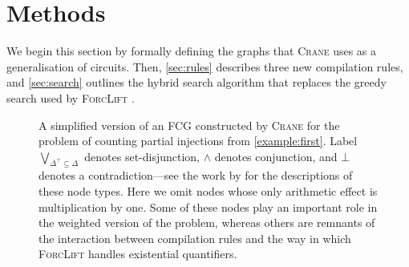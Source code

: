 \section{Methods}\label{sec:methods}

We begin this section by formally defining the graphs that \textsc{Crane} uses
as a generalisation of circuits. Then, \cref{sec:rules} describes three new
compilation rules, and \cref{sec:search} outlines the hybrid search algorithm
that replaces the greedy search used by \textsc{ForcLift}
\citep{DBLP:conf/ijcai/BroeckTMDR11}.

\begin{figure}[t]
  \centering
  \caption{A simplified version of an FCG constructed by \textsc{Crane} for the
    problem of counting partial injections from \cref{example:first}. Label
    $\bigvee_{\Delta^\top \subseteq \Delta}$ denotes set-disjunction, $\land$
    denotes conjunction, and $\bot$ denotes a contradiction---see the work by
    \citet{DBLP:conf/ijcai/BroeckTMDR11} for the descriptions of these node
    types. Here we omit nodes whose only arithmetic effect is multiplication by
    one. Some of these nodes play an important role in the weighted version of
    the problem, whereas others are remnants of the interaction between
    compilation rules and the way in which \textsc{ForcLift} handles existential
    quantifiers.}\label{fig:examplefcg}
\end{figure}

